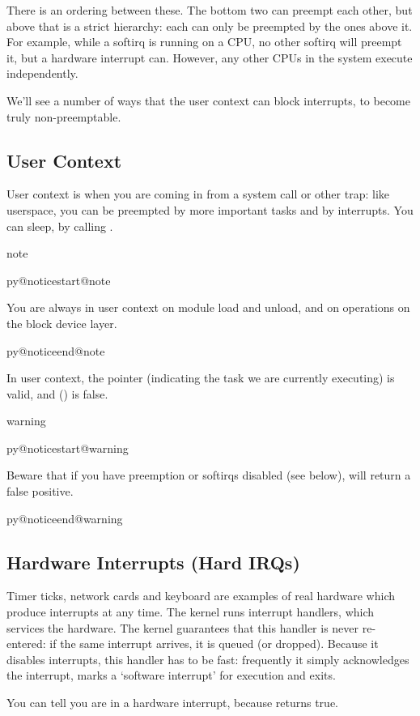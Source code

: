 \documentclass[a4paper,8pt,english]{sphinxmanual}
\makeatletter
\renewenvironment{notice}[2]{%
          \def\py@noticetype{#1}
          \begin{coloredbox}{#1}
          \bf\it
          \par\strong{#2}
          \csname py@noticestart@#1\endcsname
        }
	{
          \csname py@noticeend@\py@noticetype\endcsname
          \end{coloredbox}
        }
\makeatother
\begin{document}
There is an ordering between these. The bottom two can preempt each
other, but above that is a strict hierarchy: each can only be preempted
by the ones above it. For example, while a softirq is running on a CPU,
no other softirq will preempt it, but a hardware interrupt can. However,
any other CPUs in the system execute independently.

We'll see a number of ways that the user context can block interrupts,
to become truly non-preemptable.


\subsection{User Context}
\label{kernel-hacking/hacking:user-context}
User context is when you are coming in from a system call or other trap:
like userspace, you can be preempted by more important tasks and by
interrupts. You can sleep, by calling .

\begin{notice}{note}{Note:}
You are always in user context on module load and unload, and on
operations on the block device layer.
\end{notice}

In user context, the  pointer (indicating the task we are
currently executing) is valid, and 
() is false.

\begin{notice}{warning}{Warning:}
Beware that if you have preemption or softirqs disabled (see below),
 will return a false positive.
\end{notice}


\subsection{Hardware Interrupts (Hard IRQs)}
\label{kernel-hacking/hacking:hardware-interrupts-hard-irqs}
Timer ticks, network cards and keyboard are examples of real hardware
which produce interrupts at any time. The kernel runs interrupt
handlers, which services the hardware. The kernel guarantees that this
handler is never re-entered: if the same interrupt arrives, it is queued
(or dropped). Because it disables interrupts, this handler has to be
fast: frequently it simply acknowledges the interrupt, marks a `software
interrupt' for execution and exits.

You can tell you are in a hardware interrupt, because
 returns true.
\end{document}

